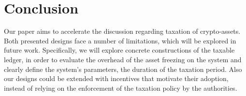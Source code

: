 \section{Conclusion}\label{sec:conclusion}

Our paper aims to accelerate the discussion regarding taxation of
crypto-assets. Both presented designs face a number of limitations, which will
be explored in future work. Specifically, we will explore concrete
constructions of the taxable ledger, in order to evaluate the overhead of the
asset freezing on the system and clearly define the system's parameters, \eg
the duration of the taxation period. Also our designs could be
extended with incentives that motivate their adoption, instead of relying on
the enforcement of the taxation policy by the authorities.
